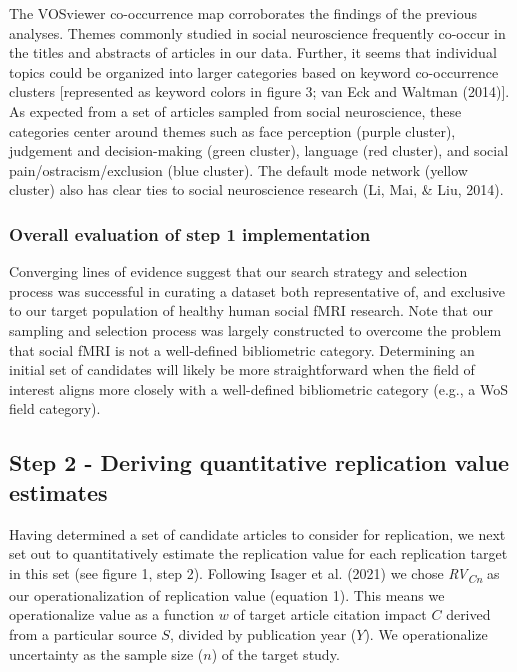 \documentclass[
  man,floatsintext]{apa6}
\begin{document}
The VOSviewer co-occurrence map corroborates the findings of the previous analyses. Themes commonly studied in social neuroscience frequently co-occur in the titles and abstracts of articles in our data. Further, it seems that individual topics could be organized into larger categories based on keyword co-occurrence clusters {[}represented as keyword colors in figure 3; van Eck and Waltman (2014){]}. As expected from a set of articles sampled from social neuroscience, these categories center around themes such as face perception (purple cluster), judgement and decision-making (green cluster), language (red cluster), and social pain/ostracism/exclusion (blue cluster). The default mode network (yellow cluster) also has clear ties to social neuroscience research (Li, Mai, \& Liu, 2014).

\hypertarget{overall-evaluation-of-step-1-implementation}{%
\subsubsection{Overall evaluation of step 1 implementation}\label{overall-evaluation-of-step-1-implementation}}

Converging lines of evidence suggest that our search strategy and selection process was successful in curating a dataset both representative of, and exclusive to our target population of healthy human social fMRI research. Note that our sampling and selection process was largely constructed to overcome the problem that social fMRI is not a well-defined bibliometric category. Determining an initial set of candidates will likely be more straightforward when the field of interest aligns more closely with a well-defined bibliometric category (e.g., a WoS field category).

\hypertarget{step-2---deriving-quantitative-replication-value-estimates}{%
\subsection{Step 2 - Deriving quantitative replication value estimates}\label{step-2---deriving-quantitative-replication-value-estimates}}

Having determined a set of candidate articles to consider for replication, we next set out to quantitatively estimate the replication value for each replication target in this set (see figure 1, step 2). Following Isager et al. (2021) we chose \emph{RV\textsubscript{Cn}} as our operationalization of replication value (equation 1). This means we operationalize value as a function \(w\) of target article citation impact \(C\) derived from a particular source \(S\), divided by publication year (\(Y\)). We operationalize uncertainty as the sample size (\(n\)) of the target study.
\end{document}
